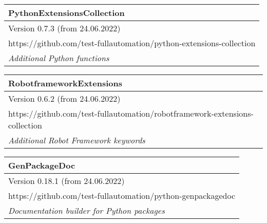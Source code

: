\begin{center}
\begin{tabular}{| m{44em} |}\hline
   \textbf{PythonExtensionsCollection}\\ \hline
   Version 0.7.3 (from 24.06.2022)\\ \hline
   https://github.com/test-fullautomation/python-extensions-collection\\ \hline
   \textit{Additional Python functions}\\ \hline
\end{tabular}

\vspace{2ex}

\begin{tabular}{| m{44em} |}\hline
   \textbf{RobotframeworkExtensions}\\ \hline
   Version 0.6.2 (from 24.06.2022)\\ \hline
   https://github.com/test-fullautomation/robotframework-extensions-collection\\ \hline
   \textit{Additional Robot Framework keywords}\\ \hline
\end{tabular}

\vspace{2ex}

\begin{tabular}{| m{44em} |}\hline
   \textbf{GenPackageDoc}\\ \hline
   Version 0.18.1 (from 24.06.2022)\\ \hline
   https://github.com/test-fullautomation/python-genpackagedoc\\ \hline
   \textit{Documentation builder for Python packages}\\ \hline
\end{tabular}

\vspace{2ex}

\end{center}

